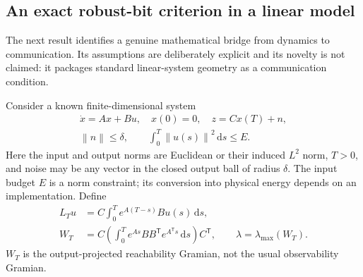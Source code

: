 \documentclass[11pt,a4paper]{article}
\theoremstyle{definition}
\theoremstyle{remark}
\newcommand{\norm}[1]{\left\lVert#1\right\rVert}
\begin{document}
\subsection{An exact robust-bit criterion in a linear model}
The next result identifies a genuine mathematical bridge from dynamics to communication. Its assumptions are deliberately explicit and its novelty is not claimed: it packages standard linear-system geometry as a communication condition.

Consider a known finite-dimensional system
\begin{equation}\label{eq:linear}
 \begin{gathered}
 \dot x=Ax+Bu,\quad x(0)=0,\quad z=Cx(T)+n,\\
 \norm{n}\leq\delta,\qquad \int_0^T\norm{u(s)}^2\,\mathrm ds\leq E.
 \end{gathered}
\end{equation}
Here the input and output norms are Euclidean or their induced $L^2$ norm, $T>0$, and noise may be any vector in the closed output ball of radius $\delta$. The input budget $E$ is a norm constraint; its conversion into physical energy depends on an implementation. Define
\begin{align}
 L_Tu&=C\int_0^T e^{A(T-s)}Bu(s)\,\mathrm ds,\label{eq:LT}\\
 W_T&=C\left(\int_0^T e^{As}BB^{\mathsf T}e^{A^{\mathsf T}s}\,\mathrm ds\right)C^{\mathsf T},
 \qquad \lambda=\lambda_{\max}(W_T).\label{eq:gramian}
\end{align}
$W_T$ is the output-projected reachability Gramian, not the usual observability Gramian.
\end{document}
